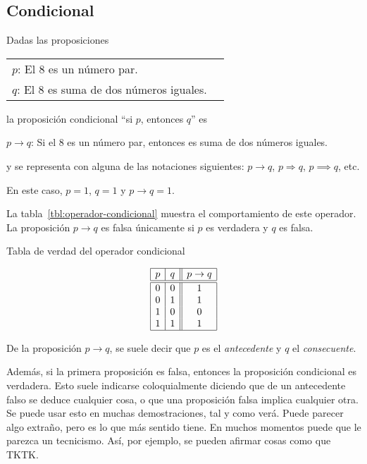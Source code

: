\subsection{Condicional}

Dadas las proposiciones

\begin{center}
\begin{tabular}{l l}
  $p$: El 8 es un número par. \\
  $q$: El 8 es suma de dos números iguales.
\end{tabular}
\end{center}

\noindent la proposición condicional ``si $p$, entonces $q$'' es

\begin{center}
  $p \to q$: Si el 8 es un número par, entonces es suma de dos
  números iguales.
\end{center}

\noindent y se representa con alguna de las notaciones siguientes: $p \to
q$, $p \Rightarrow q$, $p \implies q$, etc. 

En este caso, $p = 1$, $q = 1$ y $p \to q = 1$.

La tabla~\ref{tbl:operador-condicional} muestra el comportamiento de este
operador. La proposición $p \to q$ es falsa únicamente si $p$ es verdadera y
$q$ es falsa.

\begin{table}[h]%
  \caption{Tabla de verdad del operador condicional}
  \label{tbl:operador-condicional}%
  \centering
  $$
    \begin{array}{|c|c||c|}
      \hline
      p & q & p \to q \\
      \hline
      \hline
      0 & 0 & 1 \\
      0 & 1 & 1 \\
      1 & 0 & 0 \\
      1 & 1 & 1 \\
      \hline
    \end{array}
  $$
\end{table}

De la proposición $p \to q$, se suele decir que $p$ es el \emph{antecedente}
y $q$ el \emph{consecuente}.

Además, si la primera proposición es falsa, entonces la proposición
condicional es verdadera. Esto suele indicarse coloquialmente diciendo que
de un antecedente falso se deduce cualquier cosa, o que una proposición
falsa implica cualquier otra. Se puede usar esto en muchas demostraciones,
tal y como verá. Puede parecer algo extraño, pero es lo que más sentido
tiene. En muchos momentos puede que le parezca un tecnicismo. Así, por
ejemplo, se pueden afirmar cosas como que TKTK.

